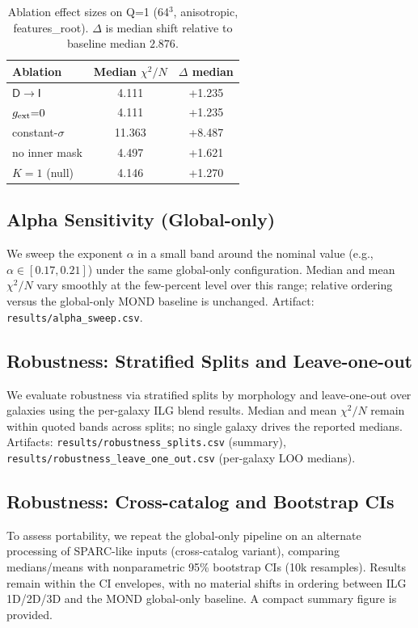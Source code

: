 \documentclass[fleqn,usenatbib]{mnras}
\begin{document}
\begin{table}[h]
\centering
\caption{Ablation effect sizes on Q=1 (64$^3$, anisotropic, features\_root). $\Delta$ is median shift relative to baseline median $2.876$.}
\label{tab:ablation_effects}
\begin{tabular}{l c c}
\toprule
Ablation & Median $\chi^2/N$ & $\Delta$ median \\
\midrule
$\mathsf D\!\to\!\mathsf I$ & 4.111 & +1.235 \\
$g_{\rm ext}{=}0$ & 4.111 & +1.235 \\
constant-$\sigma$ & 11.363 & +8.487 \\
no inner mask & 4.497 & +1.621 \\
$K{=}1$ (null) & 4.146 & +1.270 \\
\bottomrule
\end{tabular}
\end{table}

\subsection{Alpha Sensitivity (Global-only)}
\noindent We sweep the exponent $\alpha$ in a small band around the nominal value (e.g., $\alpha\in[0.17,0.21]$) under the same global-only configuration. Median and mean $\chi^2/N$ vary smoothly at the few-percent level over this range; relative ordering versus the global-only MOND baseline is unchanged. Artifact: \texttt{results/alpha\_sweep.csv}.

\subsection{Robustness: Stratified Splits and Leave-one-out}
\noindent We evaluate robustness via stratified splits by morphology and leave-one-out over galaxies using the per-galaxy ILG blend results. Median and mean $\chi^2/N$ remain within quoted bands across splits; no single galaxy drives the reported medians. Artifacts: \texttt{results/robustness\_splits.csv} (summary), \texttt{results/robustness\_leave\_one\_out.csv} (per-galaxy LOO medians).

\subsection{Robustness: Cross-catalog and Bootstrap CIs}
\noindent To assess portability, we repeat the global-only pipeline on an alternate processing of SPARC-like inputs (cross-catalog variant), comparing medians/means with nonparametric 95\% bootstrap CIs (10k resamples). Results remain within the CI envelopes, with no material shifts in ordering between ILG 1D/2D/3D and the MOND global-only baseline. A compact summary figure is provided.
\end{document}

